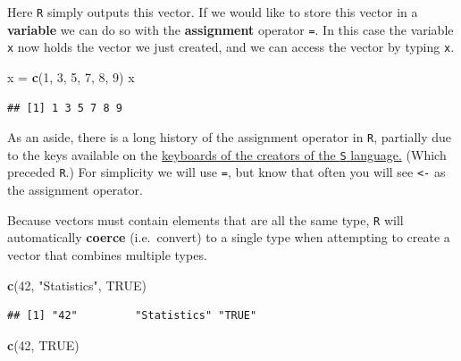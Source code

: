 \documentclass[]{book}
\newenvironment{Shaded}{\begin{snugshade}}{\end{snugshade}}
\newcommand{\KeywordTok}[1]{\textcolor[rgb]{0.13,0.29,0.53}{\textbf{#1}}}
\newcommand{\DecValTok}[1]{\textcolor[rgb]{0.00,0.00,0.81}{#1}}
\newcommand{\StringTok}[1]{\textcolor[rgb]{0.31,0.60,0.02}{#1}}
\newcommand{\OtherTok}[1]{\textcolor[rgb]{0.56,0.35,0.01}{#1}}
\newcommand{\NormalTok}[1]{#1}
\begin{document}
Here \texttt{R} simply outputs this vector. If we would like to store
this vector in a \textbf{variable} we can do so with the
\textbf{assignment} operator \texttt{=}. In this case the variable
\texttt{x} now holds the vector we just created, and we can access the
vector by typing \texttt{x}.

\begin{Shaded}
\begin{Highlighting}[]
\NormalTok{x =}\StringTok{ }\KeywordTok{c}\NormalTok{(}\DecValTok{1}\NormalTok{, }\DecValTok{3}\NormalTok{, }\DecValTok{5}\NormalTok{, }\DecValTok{7}\NormalTok{, }\DecValTok{8}\NormalTok{, }\DecValTok{9}\NormalTok{)}
\NormalTok{x}
\end{Highlighting}
\end{Shaded}

\begin{verbatim}
## [1] 1 3 5 7 8 9
\end{verbatim}

As an aside, there is a long history of the assignment operator in
\texttt{R}, partially due to the keys available on the
\href{https://twitter.com/kwbroman/status/747829864091127809}{keyboards
of the creators of the \texttt{S} language.} (Which preceded
\texttt{R}.) For simplicity we will use \texttt{=}, but know that often
you will see \texttt{\textless{}-} as the assignment operator.

Because vectors must contain elements that are all the same type,
\texttt{R} will automatically \textbf{coerce} (i.e.~convert) to a single
type when attempting to create a vector that combines multiple types.

\begin{Shaded}
\begin{Highlighting}[]
\KeywordTok{c}\NormalTok{(}\DecValTok{42}\NormalTok{, }\StringTok{"Statistics"}\NormalTok{, }\OtherTok{TRUE}\NormalTok{)}
\end{Highlighting}
\end{Shaded}

\begin{verbatim}
## [1] "42"         "Statistics" "TRUE"
\end{verbatim}

\begin{Shaded}
\begin{Highlighting}[]
\KeywordTok{c}\NormalTok{(}\DecValTok{42}\NormalTok{, }\OtherTok{TRUE}\NormalTok{)}
\end{Highlighting}
\end{Shaded}
\end{document}

